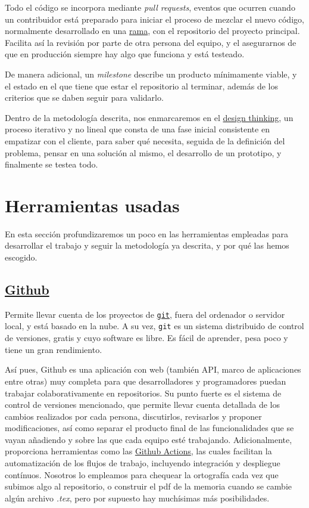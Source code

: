 Todo el código se incorpora mediante \textit{pull requests}, eventos que ocurren cuando un contribuidor está 
preparado para iniciar el proceso de mezclar el nuevo código, normalmente desarrollado en una \href{https://docs.github.com/github/collaborating-with-issues-and-pull-requests/about-branches}{rama}, 
con el repositorio del proyecto principal. Facilita así la revisión por parte de otra persona del equipo, y el 
asegurarnos de que en producción siempre hay algo que funciona y está testeado.

De manera adicional, un \textit{milestone} describe un producto mínimamente viable, y el estado en el que tiene 
que estar el repositorio al terminar, además de los criterios que se daben seguir 
para validarlo.

Dentro de la metodología descrita, nos enmarcaremos en el \href{https://www.iebschool.com/blog/design-thinking-agile-scrum/}{design thinking}, 
un proceso iterativo y no lineal que consta de una fase inicial consistente en empatizar con el 
cliente, para saber qué necesita, seguida de la definición del problema, pensar en una solución al 
mismo, el desarrollo de un prototipo, y finalmente se testea todo. 

\section{Herramientas usadas}
En esta sección profundizaremos un poco en las herramientas empleadas para desarrollar el trabajo y seguir 
la metodología ya descrita, y por qué las hemos escogido.

\subsection{\href{https://github.com/}{Github}} 

Permite llevar cuenta de los proyectos de \href{https://git-scm.com/}{\tt git}, fuera del ordenador o 
servidor local, y está basado en la nube. A su vez, {\tt git} es un 
sistema distribuido de control de versiones, gratis y cuyo software es libre. Es fácil de 
aprender, pesa poco y tiene un gran rendimiento.

Así pues, Github es una aplicación con web (también API, marco de aplicaciones entre otras) muy completa para que desarrolladores y programadores puedan trabajar colaborativamente 
en repositorios. Su punto fuerte es el sistema de control de versiones mencionado, que permite llevar cuenta detallada 
de los cambios realizados por cada persona, discutirlos, revisarlos y proponer modificaciones, así como 
separar el producto final de las funcionalidades que se vayan añadiendo y sobre las que cada equipo esté 
trabajando. Adicionalmente, proporciona herramientas como las \href{https://github.com/features/actions}{Github Actions}, 
las cuales facilitan la automatización de los flujos de trabajo, incluyendo integración y despliegue contínuos.
Nosotros lo empleamos para chequear la ortografía cada vez que subimos algo al repositorio, o construir el pdf 
de la memoria cuando se cambie algún archivo \textit{.tex}, pero por supuesto hay muchísimas más posibilidades.

